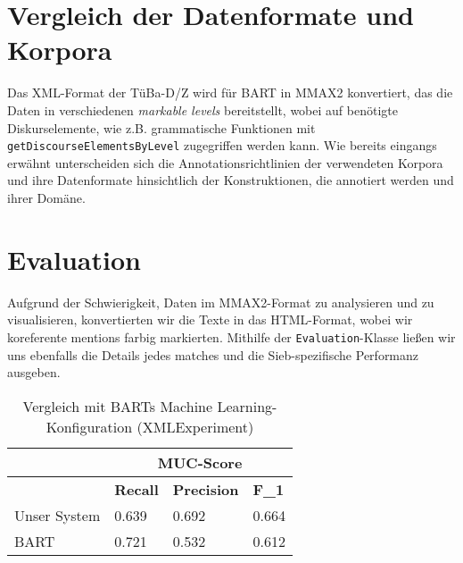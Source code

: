 \documentclass{scrartcl}
\begin{document}
\section{Vergleich der Datenformate und Korpora}
Das XML-Format der TüBa-D/Z wird für BART in MMAX2 \cite{muller2006} konvertiert, das die Daten in verschiedenen \textit{markable levels} bereitstellt, wobei auf benötigte Diskurselemente, wie z.B. grammatische Funktionen mit \texttt{getDiscourseElementsByLevel} zugegriffen werden kann. Wie bereits eingangs erwähnt unterscheiden sich die Annotationsrichtlinien der verwendeten Korpora und ihre Datenformate hinsichtlich der Konstruktionen, die annotiert werden und ihrer Domäne.

\section{Evaluation}
Aufgrund der Schwierigkeit, Daten im MMAX2-Format zu analysieren und zu visualisieren, konvertierten wir die Texte in das HTML-Format, wobei wir koreferente mentions farbig markierten. Mithilfe der \texttt{Evaluation}-Klasse ließen wir uns ebenfalls die Details jedes matches und die Sieb-spezifische Performanz ausgeben.
\begin{table}[h]
\begin{tabular}{l||ll|l}
& \multicolumn{3}{c}{\textbf{MUC-Score}} \\ \hline
               & \textbf{Recall}		 & \textbf{Precision} & \textbf{F\_1}    \\ \hline
Unser System 	& 0.639      & 0.692              & 0.664  \\
BART  & 0.721 		 & 0.532     & 0.612
          
\end{tabular}
\caption{Vergleich mit BARTs Machine Learning-Konfiguration (XMLExperiment)}
\end{table}
\\
\end{document}
